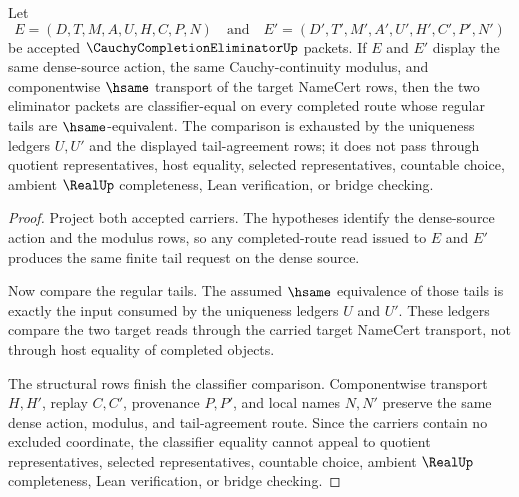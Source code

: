 \begin{theorem}
\label{thm:cauchy-completion-eliminator-uniqueness}
Let
$$
E=(D,T,M,A,U,H,C,P,N)
\quad\text{and}\quad
E'=(D',T',M',A',U',H',C',P',N')
$$
be accepted $\CauchyCompletionEliminatorUp$ packets. If $E$ and $E'$ display the same dense-source action, the same Cauchy-continuity modulus, and componentwise $\hsame$ transport of the target NameCert rows, then the two eliminator packets are classifier-equal on every completed route whose regular tails are $\hsame$-equivalent. The comparison is exhausted by the uniqueness ledgers $U,U'$ and the displayed tail-agreement rows; it does not pass through quotient representatives, host equality, selected representatives, countable choice, ambient $\RealUp$ completeness, Lean verification, or bridge checking.
\end{theorem}
\begin{proof}
Project both accepted carriers. The hypotheses identify the dense-source action and the modulus rows, so any completed-route read issued to $E$ and $E'$ produces the same finite tail request on the dense source.

Now compare the regular tails. The assumed $\hsame$ equivalence of those tails is exactly the input consumed by the uniqueness ledgers $U$ and $U'$. These ledgers compare the two target reads through the carried target NameCert transport, not through host equality of completed objects.

The structural rows finish the classifier comparison. Componentwise transport $H,H'$, replay $C,C'$, provenance $P,P'$, and local names $N,N'$ preserve the same dense action, modulus, and tail-agreement route. Since the carriers contain no excluded coordinate, the classifier equality cannot appeal to quotient representatives, selected representatives, countable choice, ambient $\RealUp$ completeness, Lean verification, or bridge checking.
\end{proof}


